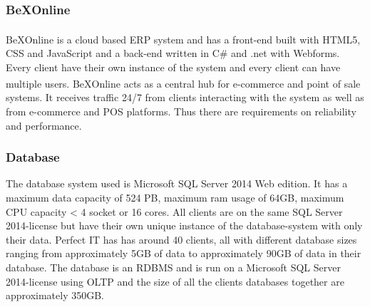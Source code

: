 \documentclass{cslthse-msc}
\newcommand{\bex}{BeX\textsuperscript{\textregistered}}
\begin{document}
\subsubsection{\bex Online}
\bex Online is a cloud based ERP  system and has a front-end built with HTML5, CSS and JavaScript and a back-end written in C\# and .net with Webforms.
Every client have their own instance of the system and every client can have multiple users. \bex Online acts as a central hub for e-commerce and point of sale systems. It receives traffic 24/7 from clients interacting with the system as well as from e-commerce and POS platforms. Thus there are requirements on reliability and performance.

\subsubsection{Database}
The database system used is Microsoft SQL Server 2014 Web edition. It has a maximum data capacity of 524 PB, maximum ram usage of 64GB, maximum CPU capacity < 4 socket or 16 cores. All clients are on the same SQL Server 2014-license but have their own unique instance of the database-system with only their data.  Perfect IT has has around 40 clients, all with different database sizes ranging from approximately 5GB of data to approximately 90GB of data in their database. The database is an RDBMS and is run on a Microsoft SQL Server 2014-license using OLTP and the size of all the clients databases together are approximately 350GB.
\end{document}
